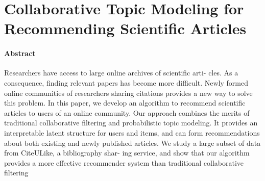 \documentclass[oneside]{book}
\begin{document}
\section{Collaborative Topic Modeling for Recommending Scientific Articles}
\paragraph{Abstract}
Researchers have access to large online archives of scientific arti-
cles. As a consequence, finding relevant papers has become more
difficult. Newly formed online communities of researchers sharing
citations provides a new way to solve this problem. In this paper, we
develop an algorithm to recommend scientific articles to users of an
online community. Our approach combines the merits of traditional
collaborative filtering and probabilistic topic modeling. It provides
an interpretable latent structure for users and items, and can form
recommendations about both existing and newly published articles.
We study a large subset of data from CiteULike, a bibliography shar-
ing service, and show that our algorithm provides a more effective
recommender system than traditional collaborative filtering
\end{document}
